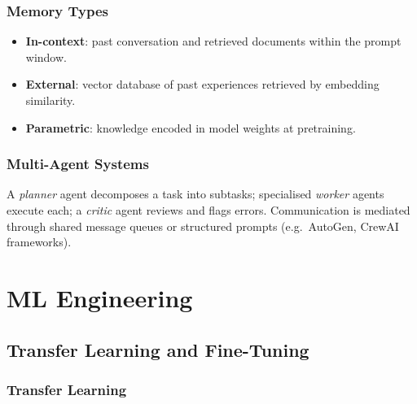 \documentclass[oneside]{book}
\begin{document}
\section{Memory Types}

\begin{itemize}
  \item \textbf{In-context}: past conversation and retrieved documents within
        the prompt window.
  \item \textbf{External}: vector database of past experiences retrieved by
        embedding similarity.
  \item \textbf{Parametric}: knowledge encoded in model weights at pretraining.
\end{itemize}

\section{Multi-Agent Systems}

A \emph{planner} agent decomposes a task into subtasks; specialised
\emph{worker} agents execute each; a \emph{critic} agent reviews and
flags errors.  Communication is mediated through shared message queues or
structured prompts (e.g.\ AutoGen, CrewAI frameworks).


\part{ML Engineering}

\chapter{Transfer Learning and Fine-Tuning}

\section{Transfer Learning}

\end{document}

